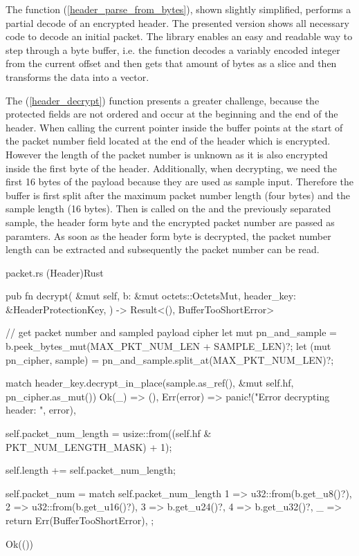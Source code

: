 The function (\ref{header_parse_from_bytes}), shown slightly simplified, performs a partial decode of
an encrypted header. The presented version shows all necessary code to decode an initial packet. The  library
enables an easy and readable way to step through a byte buffer, i.e. the function 
decodes a variably encoded integer from the current offset and then gets that amount of bytes as a slice \inlinecode{\&[u8]} and
 then transforms the data into a vector.

The (\ref{header_decrypt}) function presents a greater challenge, because the protected fields are not
ordered and occur at the beginning and the end of the header.
When calling  the current pointer inside the
buffer points at the start of the packet number field located at the end of the header which is encrypted. However the length of
the packet number is unknown as
it is also encrypted inside the first byte of the header. Additionally, when decrypting, we need the first 16 bytes of the payload
because they are used as sample input. Therefore the buffer is first split after the maximum packet number length (four bytes)
and the sample length (16 bytes). Then  is called on the  and the
previously separated sample, the header form byte and the encrypted packet number are passed as paramters. As soon as the header
form byte is decrypted, the packet number length can be extracted and subsequently the packet number can be read.

\begin{codeblock}{packet.rs (Header)}{Rust}
    \begin{rustcode}
        pub fn decrypt(
            &mut self,
            b: &mut octets::OctetsMut,
            header_key: &HeaderProtectionKey,
        ) -> Result<(), BufferTooShortError> {
            // get packet number and sampled payload cipher
            let mut pn_and_sample = b.peek_bytes_mut(MAX_PKT_NUM_LEN + SAMPLE_LEN)?;
            let (mut pn_cipher, sample) = pn_and_sample.split_at(MAX_PKT_NUM_LEN)?;

            match header_key.decrypt_in_place(sample.as_ref(), &mut self.hf, pn_cipher.as_mut()) {
                Ok(_) => (),
                Err(error) => panic!("Error decrypting header: {}", error),
            }

            self.packet_num_length = usize::from((self.hf & PKT_NUM_LENGTH_MASK) + 1);

            self.length += self.packet_num_length;

            self.packet_num = match self.packet_num_length {
                1 => u32::from(b.get_u8()?),
                2 => u32::from(b.get_u16()?),
                3 => b.get_u24()?,
                4 => b.get_u32()?,
                _ => return Err(BufferTooShortError),
            };

            Ok(())
        }
    \end{rustcode}
    \label{header_decrypt}
\end{codeblock}

